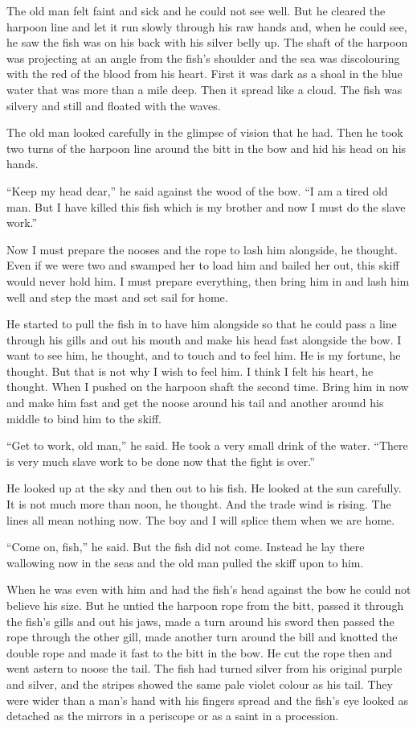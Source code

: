 \documentclass[fontset=ubuntu]{ctexrep}
\begin{document}
The old man felt faint and sick and he could not see well. But he cleared
the harpoon line and let it run slowly through his raw hands and, when he
could see, he saw the fish was on his back with his silver belly up. The
shaft of the harpoon was projecting at an angle from the fish's shoulder and
the sea was \gls{discolouring} with the red of the blood from his heart.
First it was dark as a \gls{shoal} in the blue water that was more than a
mile deep. Then it spread like a cloud. The fish was silvery and still and
floated with the \glspl{wave}.

The old man looked carefully in the \gls{glimpse} of \gls{vision} that he
had. Then he took two turns of the harpoon line around the bitt in the bow
and \gls{hid} his head on his hands.

``Keep my head dear,'' he said against the wood of the bow. ``I am a tired
old man. But I have killed this fish which is my brother and now I must do
the slave work.''

Now I must prepare the \glspl{noose} and the rope to lash him alongside, he
thought. Even if we were two and \gls{swamped} her to load him and \gls{bailed}
her out, this skiff would never hold him. I must prepare everything, then
bring him in and lash him well and step the mast and set sail for home.

He started to pull the fish in to have him alongside so that he could pass a
line through his gills and out his mouth and make his head fast alongside
the bow. I want to see him, he thought, and to touch and to feel him. He is
my \gls{fortune}, he thought. But that is not why I wish to feel him. I think I
felt his heart, he thought. When I pushed on the harpoon shaft the second
time. Bring him in now and make him fast and get the noose around his tail
and another around his middle to bind him to the skiff.

``Get to work, old man,'' he said. He took a very small drink of the water.
``There is very much slave work to be done now that the fight is over.''

He looked up at the sky and then out to his fish. He looked at the sun
carefully. It is not much more than noon, he thought. And the trade wind is
rising. The lines all mean nothing now. The boy and I will \gls{splice} them
when we are home.

``Come on, fish,'' he said. But the fish did not come. Instead he lay there
\gls{wallowing} now in the seas and the old man pulled the skiff upon to
him.

When he was even with him and had the fish's head against the bow he could
not believe his size. But he \gls{untied} the harpoon rope from the bitt,
passed it through the fish's gills and out his jaws, made a turn around his
\gls{sword} then passed the rope through the other gill, made another turn
around the bill and knotted the double rope and made it fast to the bitt in
the bow. He cut the rope then and went astern to noose the tail. The fish
had turned silver from his original purple and silver, and the stripes
showed the same pale \gls{violet} colour as his tail. They were wider than a
man's hand with his fingers spread and the fish's eye looked as
\gls{detached} as the mirrors in a \gls{periscope} or as a \gls{saint} in a
\gls{procession}.
\end{document}
